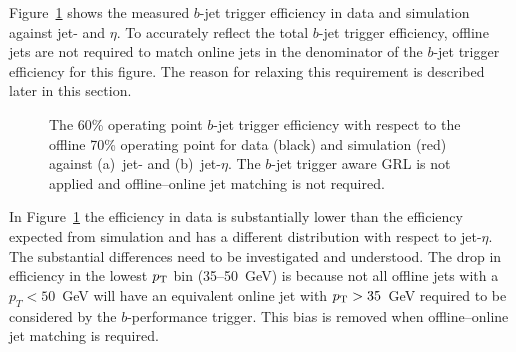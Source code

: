 Figure~\ref{fig:trig-Full_noGRL_eff_noHLTMatch} shows the measured $b$-jet trigger efficiency in data and simulation against jet-\pT{} and $\eta$.
To accurately reflect the total $b$-jet trigger efficiency, %
offline jets are not required to match online jets in the denominator of the $b$-jet trigger efficiency for this figure.
The reason for relaxing this requirement is described later in this section.

\begin{figure}[!htb]
  \begin{center}
    \captionsetup[subfigure]{aboveskip=0pt,justification=centering}
  \end{center}
  \vspace{-1em}
  \caption[The $b$-jet trigger efficiency in data and simulation
    when the $b$-jet trigger aware GRL is not applied and offline--online jet matching is not required.]
  {The 60\% operating point $b$-jet trigger efficiency with respect to the offline 70\% operating point
    for data (black) and simulation (red) against (a)~jet-\pT{} and (b)~jet-$\eta$.
    The $b$-jet trigger aware GRL is not applied and offline--online jet matching is not required.}
  \label{fig:trig-Full_noGRL_eff_noHLTMatch}
\end{figure}


In Figure~\ref{fig:trig-Full_noGRL_eff_noHLTMatch} the efficiency in data is substantially lower
than the efficiency expected from  simulation and has a different distribution with respect to jet-$\eta$.
The substantial differences need to be investigated and understood. 
The drop in efficiency in the lowest $p_{\mathrm{T}}$ bin (35--50~GeV) is because not all offline jets with a $p_T < 50$~GeV  will have an 
equivalent online jet with $p_{\mathrm{T}}{} > 35$~GeV required to be considered by the $b$-performance trigger. This bias is removed when offline--online jet matching is required.


